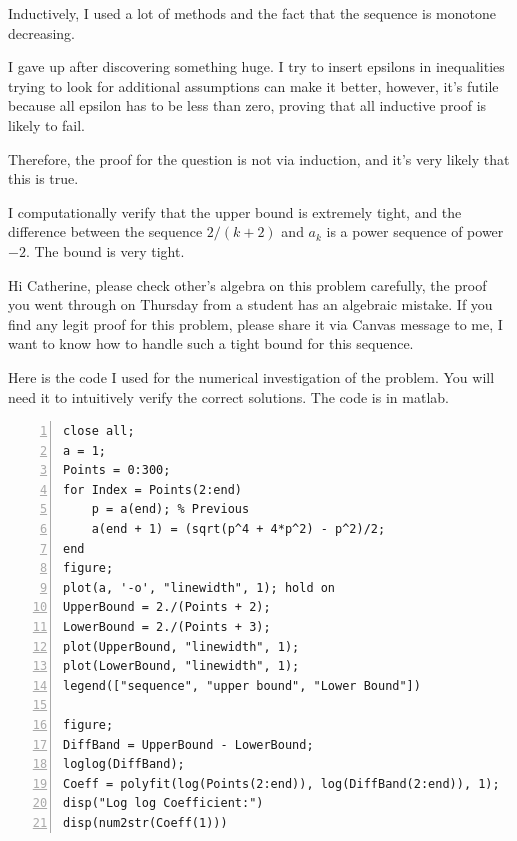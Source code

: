 \documentclass[]{article}
\begin{document}
        Inductively, I used a lot of methods and the fact that the sequence is monotone decreasing. 
        \par
        I gave up after discovering something huge. I try to insert epsilons in inequalities trying to look for additional assumptions can make it better, however, it's futile because all epsilon has to be less than zero, proving that all inductive proof is likely to fail. 
        \par
        Therefore, the proof for the question is not via induction, and it's very likely that this is true. 
        \par
        I computationally verify that the upper bound is extremely tight, and the difference between the sequence $2/(k+2)$ and $a_k$ is a power sequence of power $-2$. The bound is very tight. 
        \par
        Hi Catherine, please check other's algebra on this problem carefully, the proof you went through on Thursday from a student has an algebraic mistake. If you find any legit proof for this problem, please share it via Canvas message to me, I want to know how to handle such a tight bound for this sequence. 
        \par
        Here is the code I used for the numerical investigation of the problem. You will need it to intuitively verify the correct solutions. The code is in matlab. 
        \begin{Verbatim}[numbers=left]
close all;
a = 1;
Points = 0:300;
for Index = Points(2:end)
    p = a(end); % Previous 
    a(end + 1) = (sqrt(p^4 + 4*p^2) - p^2)/2;
end
figure; 
plot(a, '-o', "linewidth", 1); hold on
UpperBound = 2./(Points + 2);
LowerBound = 2./(Points + 3);
plot(UpperBound, "linewidth", 1);
plot(LowerBound, "linewidth", 1);
legend(["sequence", "upper bound", "Lower Bound"])

figure; 
DiffBand = UpperBound - LowerBound; 
loglog(DiffBand);
Coeff = polyfit(log(Points(2:end)), log(DiffBand(2:end)), 1);
disp("Log log Coefficient:")
disp(num2str(Coeff(1)))
        \end{Verbatim}



        
\end{document}
